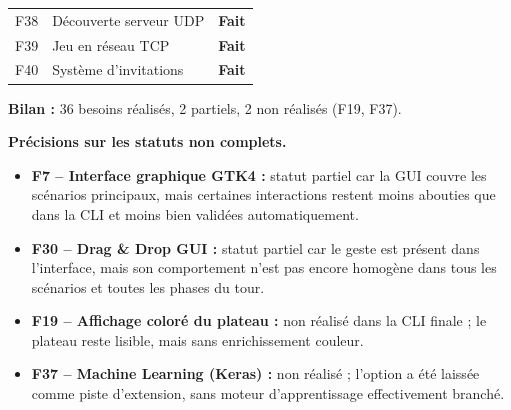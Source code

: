 \documentclass[a4paper]{article}
\providecommand{\midrule}{\hline}
\begin{document}
\begin{longtable}{c p{7cm} c}
\midrule

F38 & Découverte serveur UDP & \textcolor{fait}{\textbf{Fait}} \\
F39 & Jeu en réseau TCP & \textcolor{fait}{\textbf{Fait}} \\
F40 & Système d'invitations & \textcolor{fait}{\textbf{Fait}} \\

\end{longtable}

\textbf{Bilan :} 36 besoins réalisés, 2 partiels, 2 non réalisés (F19, F37).

\smallskip
\noindent\textbf{Précisions sur les statuts non complets.}
\begin{itemize}
    \item \textbf{F7 -- Interface graphique GTK4 :} statut partiel car la GUI couvre les scénarios principaux, mais certaines interactions restent moins abouties que dans la CLI et moins bien validées automatiquement.
    \item \textbf{F30 -- Drag \& Drop GUI :} statut partiel car le geste est présent dans l'interface, mais son comportement n'est pas encore homogène dans tous les scénarios et toutes les phases du tour.
    \item \textbf{F19 -- Affichage coloré du plateau :} non réalisé dans la CLI finale ; le plateau reste lisible, mais sans enrichissement couleur.
    \item \textbf{F37 -- Machine Learning (Keras) :} non réalisé ; l'option a été laissée comme piste d'extension, sans moteur d'apprentissage effectivement branché.
\end{itemize}
\end{document}
